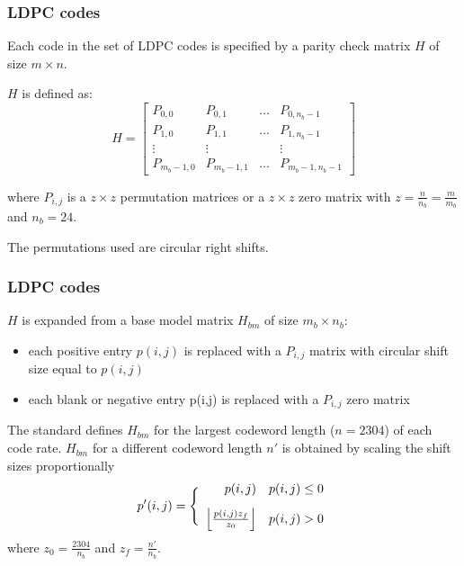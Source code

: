 \documentclass[]{beamer}
\begin{document}
\begin{frame}
\transwipe[direction=0]
\frametitle{LDPC codes}
Each code in the set of LDPC codes is specified by a parity check matrix $H$ of size $m\times n$.

$H$ is defined as:
\begin{equation*}
H = 
	\begin{bmatrix}
		P_{0,0}  & P_{0,1} & \dots & P_{0,n_b-1}\\
		P_{1,0} & P_{1,1}  & \dots & P_{1,n_b-1} \\
		\vdots & \vdots & & \vdots \\
		P_{m_b-1,0} & P_{m_b-1,1} & \dots & P_{m_b-1,n_b-1}
	\end{bmatrix}
\end{equation*}

where $P_{i,j}$ is a $z\times z$ permutation matrices or a $z\times z$ zero matrix with $z = \frac{n}{n_b} = \frac{m}{m_b}$ and $n_b = 24$. 

The permutations used are circular right shifts.

\end{frame}


\begin{frame}
\transwipe[direction=0]
\frametitle{LDPC codes}
$H$ is expanded from a base model matrix $H_{bm}$ of size $m_b\times n_b$:
\begin{itemize}
\item each positive entry $p(i,j)$ is replaced with a $P_{i,j}$ matrix with circular shift size equal to $p(i,j)$
\item each blank or negative entry p(i,j) is replaced with a $P_{i,j}$ zero matrix
\end{itemize}
\vspace{0.3cm}
The standard defines $H_{bm}$ for the largest codeword length ($n = 2304$) of each code rate. $H_{bm}$ for a different codeword length $n'$ is obtained by scaling the shift sizes proportionally
	\begin{equation*}
		p'(i,j) =  \Bigg \{
				\begin{array}{rl}
					p(i,j) & p(i,j) \leq 0 \vspace{0.3cm}\\
					
					\left\lfloor\frac{p(i,j)z_f}{z_0} \right\rfloor & p(i,j) > 0 \\
				\end{array}
	\end{equation*}
where $z_0 = \frac{2304}{n_b}$ and $z_f = \frac{n'}{n_b}$.
\end{frame}
\end{document}

